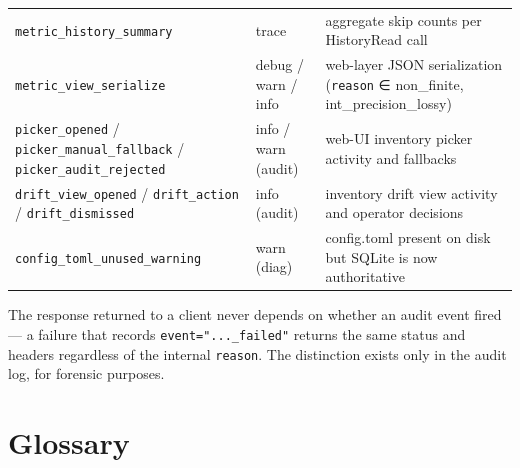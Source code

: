 \begin{longtable}[]{@{}lll@{}}
\texttt{metric\_history\_summary} & trace & aggregate skip counts per HistoryRead call \\
\texttt{metric\_view\_serialize} & debug / warn / info & web-layer JSON serialization (\texttt{reason} ∈ non\_finite, int\_precision\_lossy) \\
\texttt{picker\_opened} / \texttt{picker\_manual\_fallback} / \texttt{picker\_audit\_rejected} & info / warn (audit) & web-UI inventory picker activity and fallbacks \\
\texttt{drift\_view\_opened} / \texttt{drift\_action} / \texttt{drift\_dismissed} & info (audit) & inventory drift view activity and operator decisions \\
\texttt{config\_toml\_unused\_warning} & warn (diag) & config.toml present on disk but SQLite is now authoritative \\
\end{longtable}

The response returned to a client never depends on whether an audit event fired --- a failure that records \texttt{event="...\_failed"} returns the same status and headers regardless of the internal \texttt{reason}. The distinction exists only in the audit log, for forensic purposes.

\chapter{Glossary}\label{app-glossary}

